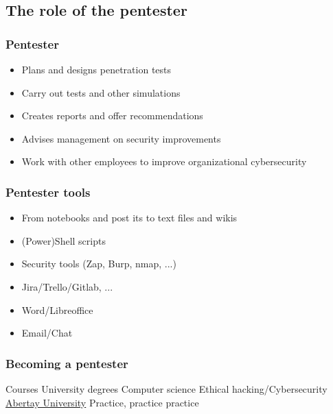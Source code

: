 \subsection{The role of the pentester}

\begin{frame}
    \frametitle{Pentester}

    \note[item]{
    }
    
    \begin{itemize}
    		\item Plans and designs penetration tests
    		\item Carry out tests and other simulations
    		\item Creates reports and offer recommendations
    		\item Advises management on security improvements
    		\item Work with other employees to improve organizational cybersecurity
    \end{itemize}
\end{frame}

\begin{frame}
    \frametitle{Pentester tools}

    \note[item]{
    }
    
    \begin{itemize}
    		\item From notebooks and post its to text files and wikis
    		\item (Power)Shell scripts
    		\item Security tools (Zap, Burp, nmap, ...)
    		\item Jira/Trello/Gitlab, ...
    		\item Word/Libreoffice
    		\item Email/Chat    		
    \end{itemize}
\end{frame}

\begin{frame}
    \frametitle{Becoming a pentester}

    \note[item]{
    }
    
	\begin{outline}
		\1 Courses
		\1 University degrees
			\2 Computer science
			\2 Ethical hacking/Cybersecurity
				\3 \href{https://www.abertay.ac.uk/course-search/undergraduate/cybersecurity/}{Abertay University}
		\1 Practice, practice practice
	\end{outline}
\end{frame}

